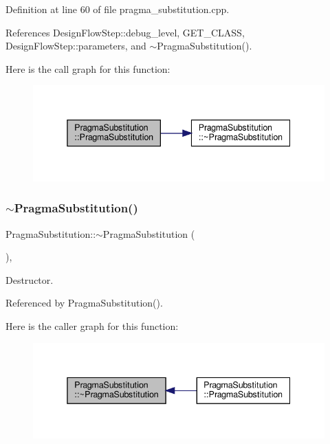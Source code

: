 Definition at line 60 of file pragma\+\_\+substitution.\+cpp.



References Design\+Flow\+Step\+::debug\+\_\+level, G\+E\+T\+\_\+\+C\+L\+A\+SS, Design\+Flow\+Step\+::parameters, and $\sim$\+Pragma\+Substitution().

Here is the call graph for this function\+:
\nopagebreak
\begin{figure}[H]
\begin{center}
\leavevmode
\includegraphics[width=338pt]{d2/d41/classPragmaSubstitution_a6467e7276ca82574dfa5470900301f2d_cgraph}
\end{center}
\end{figure}
\mbox{\label{classPragmaSubstitution_a578b94c254c5b91a3c15f6b63ea42aed}} 
\subsubsection{\texorpdfstring{$\sim$\+Pragma\+Substitution()}{~PragmaSubstitution()}}
{\footnotesize\ttfamily Pragma\+Substitution\+::$\sim$\+Pragma\+Substitution (\begin{DoxyParamCaption}{ }\end{DoxyParamCaption})\hspace{0.3cm}{\ttfamily [override]}, {\ttfamily [default]}}



Destructor. 



Referenced by Pragma\+Substitution().

Here is the caller graph for this function\+:
\nopagebreak
\begin{figure}[H]
\begin{center}
\leavevmode
\includegraphics[width=338pt]{d2/d41/classPragmaSubstitution_a578b94c254c5b91a3c15f6b63ea42aed_icgraph}
\end{center}
\end{figure}


